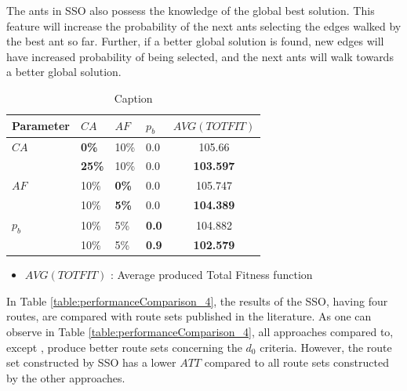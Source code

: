 The ants in SSO also possess the knowledge of the global best solution. This feature will increase the probability of the next ants selecting the edges walked by the best ant so far. Further, if a better global solution is found, new edges will have increased probability of being selected, and the next ants will walk towards a better global solution.

\begin{table}
    \centering
    \begin{tabular}{|l|l|l|l||c|}
    \hline
    Parameter & $CA$ & $AF$ & $p_b$ & $AVG(TOTFIT)$ \\
    \hline
    $CA$ & \textbf{0\%} & 10\% & 0.0 & 105.66\\
    ~ & \textbf{25\%} & 10\% & 0.0 & \textbf{103.597}\\
    \hline
    $AF$ & 10\% & \textbf{0\%} & 0.0 & 105.747 \\
    ~ & 10\% & \textbf{5\%} & 0.0 & \textbf{104.389}\\
    \hline
    $p_b$ & 10\% & 5\% & \textbf{0.0} & 104.882\\
    ~ & 10\% & 5\% & \textbf{0.9} & \textbf{102.579}\\
    \hline
    \end{tabular}
    \caption {Caption}
    \tiny
    \begin{itemize}[noitemsep]
    \item[ ] $AVG(TOTFIT)$ : Average produced Total Fitness function
    \end{itemize}
    \label{table:pm2_inEvaluation}
\end{table}

In Table \vref{table:performanceComparison_4}, the results of the SSO, having four routes, are compared with route sets published in the literature. As one can observe in Table \vref{table:performanceComparison_4}, all approaches compared to, except \citep{mandl79, kidwai98, chakroborty02}, produce better route sets concerning the $d_0$ criteria. However, the route set constructed by SSO has a lower $ATT$ compared to all route sets constructed by the other approaches. 

